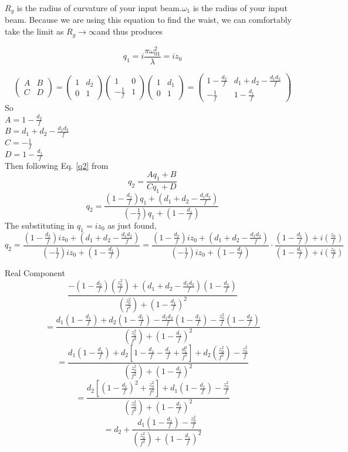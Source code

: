 \documentclass[11pt, letterpaper]{article}
\begin{document}
\begin{enumerate}
\begin{enumerate}
$R_{g}$ is the radius of curvature of your input beam.$\omega_1$ is the radius of your input beam.
Because we are using this equation to find the waist, we can comfortably take the limit as $R_g\to \infty$and thus produces

$$q_1 = i\frac{\pi \omega_{01}^2}{\lambda}=iz_0$$


$$\begin{pmatrix} A & B \\ C & D \end{pmatrix} = \begin{pmatrix} 1 & d_2 \\ 0 & 1 \end{pmatrix}\begin{pmatrix} 1 & 0 \\ -\frac{1}{f} & 1 \end{pmatrix} \begin{pmatrix} 1 & d_1 \\ 0 & 1 \end{pmatrix}=\begin{pmatrix} 1 - \frac{d_2}{f} & d_1 + d_2 - \frac{d_1 d_2}{f} \\ -\frac{1}{f} & 1 - \frac{d_1}{f} \end{pmatrix}$$
So\\ $A=1 - \frac{d_2}{f}$\\
$B =d_1 + d_2 - \frac{d_1 d_2}{f}$\\
$C=-\frac{1}{f}$\\
$D=1 - \frac{d_1}{f} $\\
Then following Eq. \ref{q2} from \cite{Osche}
\begin{equation}\label{q2}
q_2 = \frac{A q_1 + B}{C q_1 + D}
\end{equation}
$$q_2=\frac{(1 - \frac{d_2}{f})q_1 + (d_1 + d_2 - \frac{d_1 d_2}{f})}{(-\frac{1}{f}) q_1 + (1 - \frac{d_1}{f})}$$
The substituting in $q_1=iz_0$ as just found,
$$q_2=\frac{(1 - \frac{d_2}{f})iz_0 + (d_1 + d_2 - \frac{d_1 d_2}{f})}{(-\frac{1}{f})iz_0 + (1 - \frac{d_1}{f})}=\frac{(1 - \frac{d_2}{f})iz_0 + (d_1 + d_2 - \frac{d_1 d_2}{f})}{(-\frac{1}{f})iz_0 + (1 - \frac{d_1}{f})}\cdot\frac{ (1 - \frac{d_1}{f})+i(\frac{z_0}{f})}{(1 - \frac{d_1}{f})+i(\frac{z_0}{f})}$$

Real Component
$$\frac{-(1-\frac{d_2}{f})(\frac{z_0^2}{f})+(d_1+d_2-\frac{d_1d_2}{f})(1-\frac{d_1}{f})}{(\frac{z_0^2}{f^2})+(1-\frac{d_1}{f})^2}$$
$$= \frac{d_1\left(1 - \frac{d_1}{f}\right) + d_2\left(1 - \frac{d_1}{f}\right) - \frac{d_1 d_2}{f}\left(1 - \frac{d_1}{f}\right) - \frac{z_0^2}{f}\left(1 - \frac{d_2}{f}\right)}{(\frac{z_0^2}{f^2})+(1-\frac{d_1}{f})^2}$$
$$=\frac{d_1\left(1 - \frac{d_1}{f}\right)+d_2\left[1 - \frac{d_1}{f} - \frac{d_1}{f} + \frac{d_1^2}{f^2}\right] + d_2\left(\frac{z_0^2}{f^2}\right) - \frac{z_0^2}{f}}{(\frac{z_0^2}{f^2})+(1-\frac{d_1}{f})^2}$$
$$=\frac{d_2\left[\left(1 - \frac{d_1}{f}\right)^2 + \frac{z_0^2}{f^2}\right] + d_1\left(1 - \frac{d_1}{f}\right) - \frac{z_0^2}{f}}{(\frac{z_0^2}{f^2})+(1-\frac{d_1}{f})^2}$$
$$= d_2 + \frac{d_1\left(1 - \frac{d_1}{f}\right) - \frac{z_0^2}{f}}{\left(\frac{z_0^2}{f^2}\right)+\left(1-\frac{d_1}{f}\right)^2}$$



\end{enumerate}
\end{enumerate}
\end{document}
